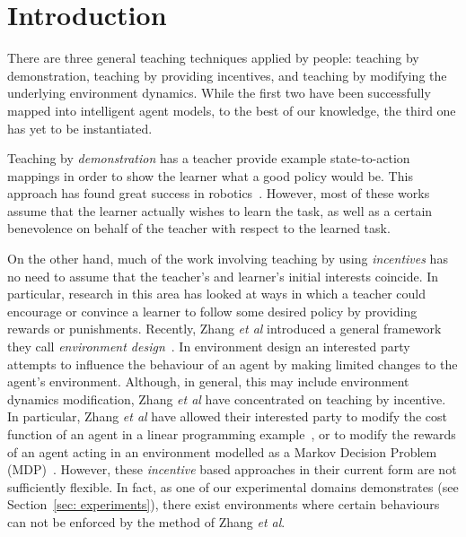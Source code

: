 \section{Introduction}

There are three general teaching techniques applied by people:
teaching by demonstration, teaching by providing incentives, and
teaching by modifying the underlying environment dynamics.  While the
first two have been successfully mapped into intelligent agent models,
to the best of our knowledge, the third one has yet to be
instantiated.

Teaching by {\em demonstration} has a teacher provide example
state-to-action mappings in order to show the learner what a good
policy would be.  This approach has found great success in
robotics~\cite{argal_etal_2009}. However, most of these works assume
that the learner actually wishes to learn the task, as well as a
certain benevolence on behalf of the teacher with respect to the
learned task.

On the other hand, much of the work involving teaching by using {\em
  incentives} has no need to assume that the teacher's and learner's
initial interests coincide.  In particular, research in this area has
looked at ways in which a teacher could encourage or convince a
learner to follow some desired policy by providing rewards or
punishments.  Recently, Zhang \emph{et al} introduced a general
framework they call \emph{environment
  design}~\cite{Zhang09:General}. In environment design an interested
party attempts to influence the behaviour of an agent by making
limited changes to the agent's environment. Although, in general, this
may include environment dynamics modification, Zhang \emph{et al} have
concentrated on teaching by incentive. In particular, Zhang \emph{et
  al} have allowed their interested party to modify the cost function
of an agent in a linear programming example~\cite{Zhang09:General}, or
to modify the rewards of an agent acting in an environment modelled as
a Markov Decision Problem
(MDP)~\cite{zhang_parkes_2008,Zhang09:Policy}. However, these {\em
  incentive} based approaches in their current form are not
sufficiently flexible. In fact, as one of our experimental domains
demonstrates (see Section~\ref{sec: experiments}), there exist
environments where certain behaviours can not be enforced by the
method of Zhang \emph{et al}.

